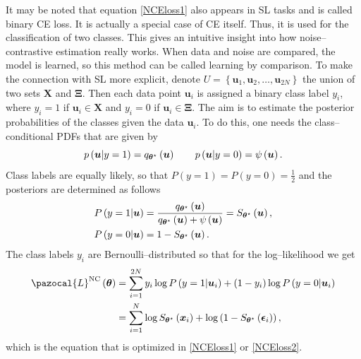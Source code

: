 It may be noted that equation \eqref{NCEloss1} also appears in SL tasks and is called binary
CE loss. It is actually a special case of CE itself. Thus, it is used for the classification of two classes. This gives an intuitive insight into how noise--contrastive estimation
really works. When data and noise are compared, the model is learned, so this method can be called
learning by comparison. To make the connection with SL more explicit, denote $U = \left\lbrace\boldsymbol{u}_1, \boldsymbol{u}_2,\dots,\boldsymbol{u}_{2N} \right\rbrace$ the union of two sets $\boldsymbol{X}$ and $\boldsymbol{\Xi}$. Then each data point $\boldsymbol{u}_i$ is assigned a binary class label $y_i$, where $y_i = 1$ if $\boldsymbol{u}_i \in \boldsymbol{X}$ and $y_i = 0$ if $\boldsymbol{u}_i \in \boldsymbol{\Xi}$. The aim is to estimate the posterior probabilities of the classes given the data $\boldsymbol{u}_i$. To do this, one needs the class--conditional PDFs that are given by
\begin{equation}
    p\left(\boldsymbol{u}\vert y =1 \right) =  q_{\boldsymbol{\theta}^\star}\left(\boldsymbol{u} \right) \qquad p\left(\boldsymbol{u}\vert y =0 \right) =  \psi\left(\boldsymbol{u} \right).
\end{equation}
Class labels are equally likely, so that $P\left(y = 1\right) =P\left(y = 0\right)=\frac{1}{2}$ and the posteriors are determined as follows
\begin{align}
    P\left( y=1 \vert\boldsymbol{u} \right) &= \frac{q_{\boldsymbol{\theta}^\star}\left(\boldsymbol{u} \right)}{q_{\boldsymbol{\theta}^\star}\left(\boldsymbol{u} \right) + \psi\left(\boldsymbol{u} \right)} = S_{\boldsymbol{\theta}^\star}\left(\boldsymbol{u}\right),\\
    P\left( y=0\vert \boldsymbol{u} \right) &= 1 - S_{\boldsymbol{\theta}^\star}\left(\boldsymbol{u}\right).
\end{align}
The class labels $y_i$ are Bernoulli--distributed so that
for the log--likelihood we get
\begin{align}
    \pazocal{L}^{\mathrm{NC}}\left(\bt\right) &= \sum_{i=1}^{2N} y_i\log P\left( y=1 \vert\boldsymbol{u}_i \right) + \left(1-y_i\right)\log P\left( y=0 \vert\boldsymbol{u}_i \right) \\
    &= \sum_{i=1}^{N}\log S_{\bt^\star}\left(\boldsymbol{x}_i\right) +\log \left(1 - S_{\bt^\star}\left(\boldsymbol{\epsilon}_i\right)\right),
\end{align}
which is the equation that is optimized in \eqref{NCEloss1} or \eqref{NCEloss2}.
